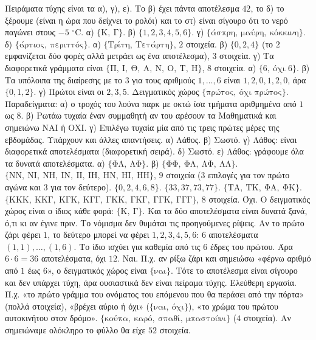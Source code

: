  Πειράματα τύχης είναι τα α), γ), ε). Το β) έχει πάντα αποτέλεσμα $42$, το δ) το ξέρουμε (είναι η ώρα που δείχνει το ρολόι) και το στ) είναι σίγουρο ότι το νερό παγώνει στους $-5$ $^\circ$C.
 α) $\{\mathrm{Κ},\ \mathrm{Γ}\}$. β) $\{1,2,3,4,5,6\}$. γ) $\{\text{άσπρη},\ \text{μαύρη},\ \text{κόκκινη}\}$. δ) $\{\text{άρτιος},\ \text{περιττός}\}$.
 α) $\{\text{Τρίτη},\ \text{Τετάρτη}\}$, $2$ στοιχεία. β) $\{0,2,4\}$ (το $2$ εμφανίζεται δύο φορές αλλά μετράει ως ένα αποτέλεσμα), $3$ στοιχεία. γ) Τα διαφορετικά γράμματα είναι $\{\mathrm{Π},\ \mathrm{Ι},\ \mathrm{Θ},\ \mathrm{Α},\ \mathrm{Ν},\ \mathrm{Ο},\ \mathrm{Τ},\ \mathrm{Η}\}$, $8$ στοιχεία.
 α) $\{6,\ \text{όχι }6\}$. β) Τα υπόλοιπα της διαίρεσης με το $3$ για τους αριθμούς $1,\dots,6$ είναι $1,2,0,1,2,0$, άρα $\{0,1,2\}$. γ) Πρώτοι είναι οι $2,3,5$. Δειγματικός χώρος $\{\text{πρώτος},\ \text{όχι πρώτος}\}$.
 Παραδείγματα: α) ο τροχός του λούνα παρκ με οκτώ ίσα τμήματα αριθμημένα από $1$ ως $8$. β) Ρωτάω τυχαία έναν συμμαθητή αν του αρέσουν τα Μαθηματικά και σημειώνω ΝΑΙ ή ΟΧΙ. γ) Επιλέγω τυχαία μία από τις τρεις πρώτες μέρες της εβδομάδας. Υπάρχουν και άλλες απαντήσεις.
 α) Λάθος. β) Σωστό. γ) Λάθος: είναι διαφορετικά αποτελέσματα (διαφορετική σειρά). δ) Σωστό. ε) Λάθος: γράφουμε όλα τα δυνατά αποτελέσματα.
 α) $\{\mathrm{ΦΛ},\ \mathrm{ΛΦ}\}$. β) $\{\mathrm{ΦΦ},\ \mathrm{ΦΛ},\ \mathrm{ΛΦ},\ \mathrm{ΛΛ}\}$.
 $\{\mathrm{ΝΝ},\ \mathrm{ΝΙ},\ \mathrm{ΝΗ},\ \mathrm{ΙΝ},\ \mathrm{ΙΙ},\ \mathrm{ΙΗ},\ \mathrm{ΗΝ},\ \mathrm{ΗΙ},\ \mathrm{ΗΗ}\}$, $9$ στοιχεία ($3$ επιλογές για τον πρώτο αγώνα και $3$ για τον δεύτερο).
 $\{0,2,4,6,8\}$.
 $\{33,37,73,77\}$.
 $\{\mathrm{ΤΑ},\ \mathrm{ΤΚ},\ \mathrm{ΦΑ},\ \mathrm{ΦΚ}\}$.
 $\{\mathrm{ΚΚΚ},\ \mathrm{ΚΚΓ},\ \mathrm{ΚΓΚ},\ \mathrm{ΚΓΓ},\ \mathrm{ΓΚΚ},\ \mathrm{ΓΚΓ},\ \mathrm{ΓΓΚ},\ \mathrm{ΓΓΓ}\}$, $8$ στοιχεία.
 Όχι. Ο δειγματικός χώρος είναι ο ίδιος κάθε φορά: $\{\mathrm{Κ},\ \mathrm{Γ}\}$. Και τα δύο αποτελέσματα είναι δυνατά ξανά, ό,τι κι αν έγινε πριν. Το νόμισμα δεν θυμάται τις προηγούμενες ρίψεις.
 Αν το πρώτο ζάρι φέρει $1$, το δεύτερο μπορεί να φέρει $1,2,3,4,5,6$: $6$ αποτελέσματα $(1,1),\dots,(1,6)$. Το ίδιο ισχύει για καθεμία από τις $6$ έδρες του πρώτου. Άρα $6\cdot6=36$ αποτελέσματα, όχι $12$.
 Ναι. Π.χ. αν ρίξω ζάρι και σημειώσω «φέρνω αριθμό από $1$ έως $6$», ο δειγματικός χώρος είναι $\{\text{ναι}\}$. Τότε το αποτέλεσμα είναι σίγουρο και δεν υπάρχει τύχη, άρα ουσιαστικά δεν είναι πείραμα τύχης.
 Ελεύθερη εργασία. Π.χ. «το πρώτο γράμμα του ονόματος του επόμενου που θα περάσει από την πόρτα» (πολλά στοιχεία), «βρέχει αύριο ή όχι» ($\{\text{ναι},\ \text{όχι}\}$), «το χρώμα του πρώτου αυτοκινήτου στον δρόμο».
 $\{\text{κούπα},\ \text{καρό},\ \text{σπαθί},\ \text{μπαστούνι}\}$ ($4$ στοιχεία). Αν σημειώναμε ολόκληρο το φύλλο θα είχε $52$ στοιχεία.
